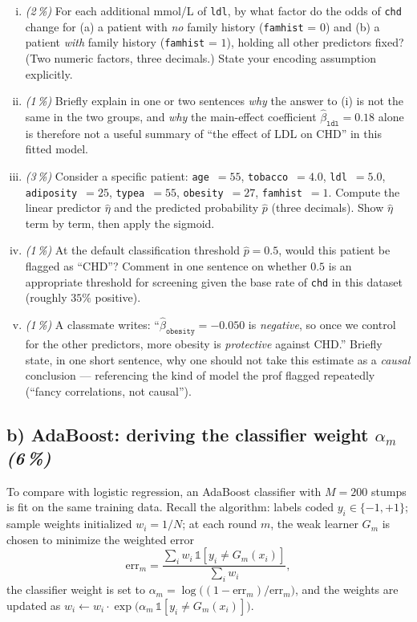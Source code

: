 \documentclass[11pt,a4paper]{article}
\newcommand{\subpoints}[1]{\textit{(#1\,\%)}}
\begin{document}
\begin{enumerate}[(i)]
  \item \subpoints{2} For each additional mmol/L of \texttt{ldl}, by what factor do the odds of \texttt{chd} change for (a) a patient with \emph{no} family history (\texttt{famhist} = $0$) and (b) a patient \emph{with} family history (\texttt{famhist} = $1$), holding all other predictors fixed? (Two numeric factors, three decimals.) State your encoding assumption explicitly.

  \item \subpoints{1} Briefly explain in one or two sentences \emph{why} the answer to (i) is not the same in the two groups, and \emph{why} the main-effect coefficient $\hat\beta_{\texttt{ldl}} = 0.18$ alone is therefore not a useful summary of ``the effect of LDL on CHD'' in this fitted model.

  \item \subpoints{3} Consider a specific patient: \texttt{age}~$=55$, \texttt{tobacco}~$=4.0$, \texttt{ldl}~$=5.0$, \texttt{adiposity}~$=25$, \texttt{typea}~$=55$, \texttt{obesity}~$=27$, \texttt{famhist}~$=1$. Compute the linear predictor $\hat\eta$ and the predicted probability $\hat p$ (three decimals). Show $\hat\eta$ term by term, then apply the sigmoid.

  \item \subpoints{1} At the default classification threshold $\hat p = 0.5$, would this patient be flagged as ``CHD''? Comment in one sentence on whether $0.5$ is an appropriate threshold for screening given the base rate of \texttt{chd} in this dataset (roughly $35\%$ positive).

  \item \subpoints{1} A classmate writes: ``$\hat\beta_{\texttt{obesity}} = -0.050$ is \emph{negative}, so once we control for the other predictors, more obesity is \emph{protective} against CHD.'' Briefly state, in one short sentence, why one should not take this estimate as a \emph{causal} conclusion --- referencing the kind of model the prof flagged repeatedly (``fancy correlations, not causal'').
\end{enumerate}

\subsection*{b) AdaBoost: deriving the classifier weight $\alpha_m$ \subpoints{6}}

To compare with logistic regression, an AdaBoost classifier with $M = 200$ stumps is fit on the same training data. Recall the algorithm: labels coded $y_i \in \{-1, +1\}$; sample weights initialized $w_i = 1/N$; at each round $m$, the weak learner $G_m$ is chosen to minimize the weighted error
$$\mathrm{err}_m = \frac{\sum_i w_i \,\mathbb{1}[y_i \neq G_m(x_i)]}{\sum_i w_i},$$
the classifier weight is set to $\alpha_m = \log\!\bigl((1 - \mathrm{err}_m) / \mathrm{err}_m\bigr)$, and the weights are updated as $w_i \leftarrow w_i \cdot \exp\!\bigl(\alpha_m \,\mathbb{1}[y_i \neq G_m(x_i)]\bigr)$.
\end{document}

